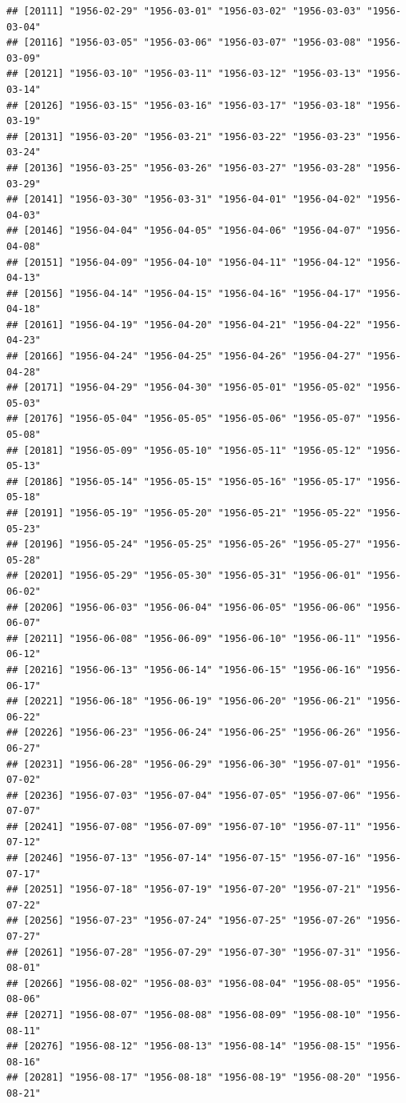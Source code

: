 \documentclass{article}\usepackage[]{graphicx}\usepackage[]{color}
\makeatletter
\newenvironment{kframe}{%
 \def\at@end@of@kframe{}%
 \ifinner\ifhmode%
  \def\at@end@of@kframe{\end{minipage}}%
  \begin{minipage}{\columnwidth}%
 \fi\fi%
 \def\FrameCommand##1{\hskip\@totalleftmargin \hskip-\fboxsep
 \colorbox{shadecolor}{##1}\hskip-\fboxsep
     \hskip-\linewidth \hskip-\@totalleftmargin \hskip\columnwidth}%
 \MakeFramed {\advance\hsize-\width
   \@totalleftmargin\z@ \linewidth\hsize
   \@setminipage}}%
 {\par\unskip\endMakeFramed%
 \at@end@of@kframe}
\newenvironment{knitrout}{}{} %
\makeatother
\begin{document}
\begin{description}
\begin{knitrout}
\begin{kframe}
\begin{verbatim}
## [20111] "1956-02-29" "1956-03-01" "1956-03-02" "1956-03-03" "1956-03-04"
## [20116] "1956-03-05" "1956-03-06" "1956-03-07" "1956-03-08" "1956-03-09"
## [20121] "1956-03-10" "1956-03-11" "1956-03-12" "1956-03-13" "1956-03-14"
## [20126] "1956-03-15" "1956-03-16" "1956-03-17" "1956-03-18" "1956-03-19"
## [20131] "1956-03-20" "1956-03-21" "1956-03-22" "1956-03-23" "1956-03-24"
## [20136] "1956-03-25" "1956-03-26" "1956-03-27" "1956-03-28" "1956-03-29"
## [20141] "1956-03-30" "1956-03-31" "1956-04-01" "1956-04-02" "1956-04-03"
## [20146] "1956-04-04" "1956-04-05" "1956-04-06" "1956-04-07" "1956-04-08"
## [20151] "1956-04-09" "1956-04-10" "1956-04-11" "1956-04-12" "1956-04-13"
## [20156] "1956-04-14" "1956-04-15" "1956-04-16" "1956-04-17" "1956-04-18"
## [20161] "1956-04-19" "1956-04-20" "1956-04-21" "1956-04-22" "1956-04-23"
## [20166] "1956-04-24" "1956-04-25" "1956-04-26" "1956-04-27" "1956-04-28"
## [20171] "1956-04-29" "1956-04-30" "1956-05-01" "1956-05-02" "1956-05-03"
## [20176] "1956-05-04" "1956-05-05" "1956-05-06" "1956-05-07" "1956-05-08"
## [20181] "1956-05-09" "1956-05-10" "1956-05-11" "1956-05-12" "1956-05-13"
## [20186] "1956-05-14" "1956-05-15" "1956-05-16" "1956-05-17" "1956-05-18"
## [20191] "1956-05-19" "1956-05-20" "1956-05-21" "1956-05-22" "1956-05-23"
## [20196] "1956-05-24" "1956-05-25" "1956-05-26" "1956-05-27" "1956-05-28"
## [20201] "1956-05-29" "1956-05-30" "1956-05-31" "1956-06-01" "1956-06-02"
## [20206] "1956-06-03" "1956-06-04" "1956-06-05" "1956-06-06" "1956-06-07"
## [20211] "1956-06-08" "1956-06-09" "1956-06-10" "1956-06-11" "1956-06-12"
## [20216] "1956-06-13" "1956-06-14" "1956-06-15" "1956-06-16" "1956-06-17"
## [20221] "1956-06-18" "1956-06-19" "1956-06-20" "1956-06-21" "1956-06-22"
## [20226] "1956-06-23" "1956-06-24" "1956-06-25" "1956-06-26" "1956-06-27"
## [20231] "1956-06-28" "1956-06-29" "1956-06-30" "1956-07-01" "1956-07-02"
## [20236] "1956-07-03" "1956-07-04" "1956-07-05" "1956-07-06" "1956-07-07"
## [20241] "1956-07-08" "1956-07-09" "1956-07-10" "1956-07-11" "1956-07-12"
## [20246] "1956-07-13" "1956-07-14" "1956-07-15" "1956-07-16" "1956-07-17"
## [20251] "1956-07-18" "1956-07-19" "1956-07-20" "1956-07-21" "1956-07-22"
## [20256] "1956-07-23" "1956-07-24" "1956-07-25" "1956-07-26" "1956-07-27"
## [20261] "1956-07-28" "1956-07-29" "1956-07-30" "1956-07-31" "1956-08-01"
## [20266] "1956-08-02" "1956-08-03" "1956-08-04" "1956-08-05" "1956-08-06"
## [20271] "1956-08-07" "1956-08-08" "1956-08-09" "1956-08-10" "1956-08-11"
## [20276] "1956-08-12" "1956-08-13" "1956-08-14" "1956-08-15" "1956-08-16"
## [20281] "1956-08-17" "1956-08-18" "1956-08-19" "1956-08-20" "1956-08-21"

\end{verbatim}
\end{kframe}
\end{knitrout}
\end{description}
\end{document}
